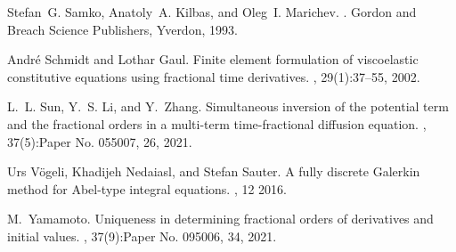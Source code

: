 \documentclass[12pt]{article}
\begin{document}
\begin{thebibliography}{10}
Stefan~G. Samko, Anatoly~A. Kilbas, and Oleg~I. Marichev.
.
\newblock Gordon and Breach Science Publishers, Yverdon, 1993.

Andr{\'e} Schmidt and Lothar Gaul.
\newblock Finite element formulation of viscoelastic constitutive equations
  using fractional time derivatives.
, 29(1):37--55, 2002.

L.~L. Sun, Y.~S. Li, and Y.~Zhang.
\newblock Simultaneous inversion of the potential term and the fractional
  orders in a multi-term time-fractional diffusion equation.
, 37(5):Paper No. 055007, 26, 2021.

Urs V\"ogeli, Khadijeh Nedaiasl, and Stefan Sauter.
\newblock A fully discrete {G}alerkin method for {A}bel-type integral
  equations.
, 12 2016.

M.~Yamamoto.
\newblock Uniqueness in determining fractional orders of derivatives and
  initial values.
, 37(9):Paper No. 095006, 34, 2021.

\end{thebibliography}
\end{document}
